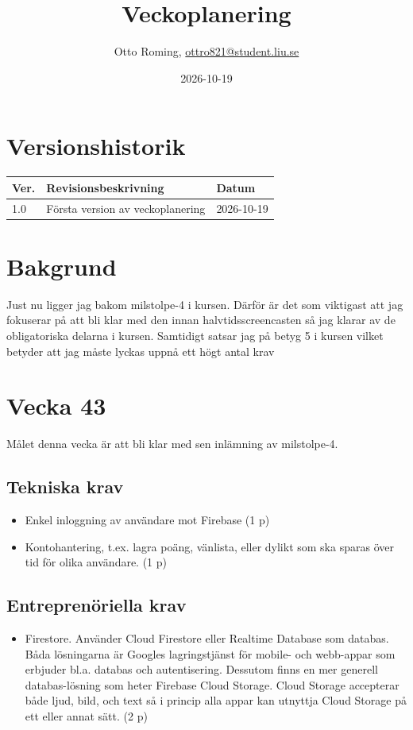 \documentclass{TDP003mall}
\author{Otto Roming, \url{ottro821@student.liu.se}}
\title{Veckoplanering}
\date{2026-10-19}
\begin{document}
\projectpage
\section{Versionshistorik}
\begin{table}[!h]
\begin{tabularx}{\linewidth}{|l|X|l|}
\hline
Ver. & Revisionsbeskrivning & Datum \\\hline
1.0 & Första version av veckoplanering & 2026-10-19 \\\hline
\end{tabularx}
\end{table}


\section{Bakgrund}
Just nu ligger jag bakom milstolpe-4 i kursen. Därför är det som viktigast att jag fokuserar på att bli klar med den innan halvtidsscreencasten så jag klarar av de obligatoriska delarna i kursen. Samtidigt satsar jag på betyg 5 i kursen vilket betyder att jag måste lyckas uppnå ett högt antal krav

\section{Vecka 43}
Målet denna vecka är att bli klar med sen inlämning av milstolpe-4.

\subsection{Tekniska krav}
\begin{itemize}
    \item Enkel inloggning av användare mot Firebase (1 p)
    \item Kontohantering, t.ex. lagra poäng, vänlista, eller dylikt som ska sparas över tid för olika användare. (1 p) 
\end{itemize}

\subsection{Entreprenöriella krav}
\begin{itemize}
    \item Firestore. Använder Cloud Firestore eller Realtime Database som databas. Båda lösningarna är Googles lagringstjänst för mobile- och webb-appar som erbjuder bl.a. databas och autentisering. Dessutom finns en mer generell databas-lösning som heter Firebase Cloud Storage. Cloud Storage accepterar både ljud, bild, och text så i princip alla appar kan utnyttja Cloud Storage på ett eller annat sätt. (2 p)
\end{itemize}
\end{document}
